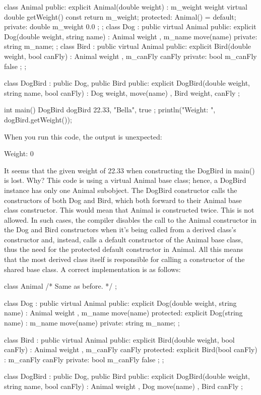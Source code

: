 \begin{cpp}
class Animal
{
    public:
        explicit Animal(double weight) : m_weight { weight } {}
        virtual double getWeight() const { return m_weight; }
    protected:
        Animal() = default;
    private:
        double m_weight { 0.0 };
};
class Dog : public virtual Animal
{
    public:
        explicit Dog(double weight, string name)
            : Animal { weight }, m_name { move(name) } {}
    private:
        string m_name;
};
class Bird : public virtual Animal
{
    public:
        explicit Bird(double weight, bool canFly)
            : Animal { weight }, m_canFly { canFly } {}
    private:
        bool m_canFly { false };
};

class DogBird : public Dog, public Bird
{
    public:
        explicit DogBird(double weight, string name, bool canFly)
            : Dog { weight, move(name) }, Bird { weight, canFly } {}
};

int main()
{
    DogBird dogBird { 22.33, "Bella", true };
    println("Weight: {}", dogBird.getWeight());
}
\end{cpp}

When you run this code, the output is unexpected:

\begin{cpp}
Weight: 0
\end{cpp}

It seems that the given weight of 22.33 when constructing the DogBird in main() is lost. Why? This code is using a virtual Animal base class; hence, a DogBird instance has only one Animal subobject. The DogBird constructor calls the constructors of both Dog and Bird, which both forward to their Animal base class constructor. This would mean that Animal is constructed twice. This is not allowed. In such cases, the compiler disables the call to the Animal constructor in the Dog and Bird constructors when it’s being called from a derived class’s constructor and, instead, calls a default constructor of the Animal base class, thus the need for the protected default constructor in Animal. All this means that the most derived class itself is responsible for calling a constructor of the shared base class. A correct implementation is as follows:

\begin{cpp}
class Animal { /* Same as before. */ };

class Dog : public virtual Animal
{
    public:
        explicit Dog(double weight, string name)
            : Animal { weight }, m_name { move(name) } {}
    protected:
        explicit Dog(string name) : m_name { move(name) } {}
    private:
        string m_name;
};

class Bird : public virtual Animal
{
    public:
        explicit Bird(double weight, bool canFly)
            : Animal { weight }, m_canFly { canFly } {}
    protected:
        explicit Bird(bool canFly) : m_canFly { canFly } {}
    private:
        bool m_canFly { false };
};

class DogBird : public Dog, public Bird
{
    public:
        explicit DogBird(double weight, string name, bool canFly)
            : Animal { weight }, Dog { move(name) }, Bird { canFly } {}
};
\end{cpp}

